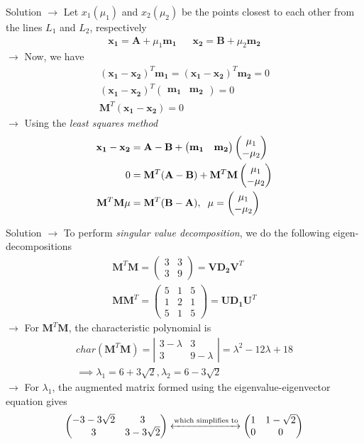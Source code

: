 \documentclass{beamer}
\numberwithin{equation}{section}
\theoremstyle{remark}
\newcommand{\myvec}[1]{\ensuremath{\begin{pmatrix}#1\end{pmatrix}}}
\let\vec\mathbf
\begin{document}
\begin{frame}{Solution}
$\longrightarrow$ Let $x_1(\mu_1)$ and $x_2(\mu_2)$ be the points closest to each other from the lines $L_1$ and $L_2$, respectively
\begin{align}
     \vec{x_1} = \vec{A} + \mu_1\vec{m_1} &&
     \vec{x_2} = \vec{B} + \mu_2\vec{m_2}
\end{align}
$\rightarrow$ Now, we have
\begin{align}
    (\vec{x_1}-\vec{x_2})^T\vec{m_1} = (\vec{x_1}-\vec{x_2})^T\vec{m_2} = 0 \\
    (\vec{x_1}-\vec{x_2})^T \myvec{\vec{m_1}&\vec{m_2}} = 0\\
    \vec{M}^T (\vec{x_1}-\vec{x_2}) = 0
\end{align}
$\rightarrow$ Using the \textit{least squares method}
\begin{align}
    \vec{x_1}-\vec{x_2} &= \vec{A}-\vec{B}+\myvec{\vec{m_1}&\vec{m_2}}\myvec{\mu_1\\-\mu_2} \\
    0 &= \vec{M}^T(\vec{A}-\vec{B})+\vec{M}^T\vec{M}\myvec{\mu_1\\-\mu_2} \\
    \vec{M}^T\vec{M}\vec{\mu} &= \vec{M}^T(\vec{B}-\vec{A}),\hspace{0.2cm} \vec{\mu} = \myvec{\mu_1\\-\mu_2}
\end{align}
\end{frame}

\begin{frame}{Solution}
$\longrightarrow$ To perform \textit{singular value decomposition}, we do the following eigen-decompositions
\begin{align}
    \vec{M}^T\vec{M} = \myvec{3&3\\3&9} = \vec{V}\vec{D_2}\vec{V}^T \\
    \vec{M}\vec{M}^T = \myvec{5&1&5\\1&2&1\\5&1&5} = \vec{U}\vec{D_1}\vec{U}^T 
\end{align}
$\rightarrow$ For $\vec{M}^T\vec{M}$, the characteristic polynomial is
\begin{align}
    char(\vec{M}^T\vec{M}) = \left|\begin{array}{cc}3-\lambda&3\\3&9-\lambda\end{array}\right| = \lambda^2 - 12\lambda + 18 \\
    \implies \lambda_1 = 6 + 3\sqrt{2}, \lambda_2 = 6 - 3\sqrt{2}
\end{align}
$\rightarrow$ For $\lambda_1$, the augmented matrix formed using the eigenvalue-eigenvector equation gives
\begin{align}
    \myvec{-3-3\sqrt{2}&3\\3&3-3\sqrt{2}}\xleftrightarrow{\text{which simplifies to}}\myvec{1&1-\sqrt{2}\\0&0}
\end{align}
\end{frame}
\end{document}
